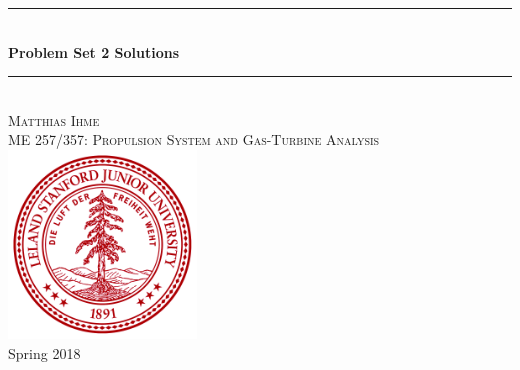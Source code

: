 \documentclass[12pt]{article}
\begin{document}

\begin{titlepage}

\newcommand{\ddz}[1]{\frac{\mathrm{d} #1}{\mathrm{d} z}}
\newcommand{\HRule}{\rule{\linewidth}{0.5mm}} %

\center %
 

 




\HRule \\[1 cm]
{ \huge \bfseries Problem Set 2 Solutions}\\[0.4cm] %
\HRule \\[2cm]
 

\Large  \textsc{Matthias Ihme}\\[2cm] %
\textsc{\large ME 257/357: Propulsion System and Gas-Turbine Analysis}\\[2cm] %

\includegraphics[width=50mm]{stanford_seal.png}\\[2cm] %
{\large Spring 2018}%


\end{titlepage}
\end{document}
